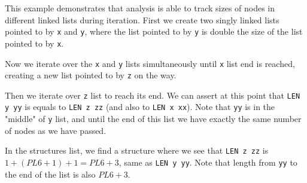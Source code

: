 This example demonstrates that analysis is able to track sizes of nodes in different linked lists during iteration. First we create two singly linked lists pointed to by \texttt{x} and \texttt{y}, where the list pointed to by \texttt{y} is double the size of the list pointed to by \texttt{x}.

Now we iterate over the \texttt{x} and \texttt{y} lists simultaneously until \texttt{x} list end is reached, creating a new list pointed to by \texttt{z} on the way.

Then we iterate over \texttt{z} list to reach its end. We can assert at this point that \texttt{LEN y yy} is equals to \texttt{LEN z zz} (and also to \texttt{LEN x xx}). Note that \texttt{yy} is in the "middle" of \texttt{y} list, and until the end of this list we have exactly the same number of nodes as we have passed.

In the structures list, we find a structure where we see that \texttt{LEN z zz} is $1+(PL6+1)+1=PL6+3$, same as \texttt{LEN y yy}. Note that length from \texttt{yy} to the end of the list is also $PL6+3$.
